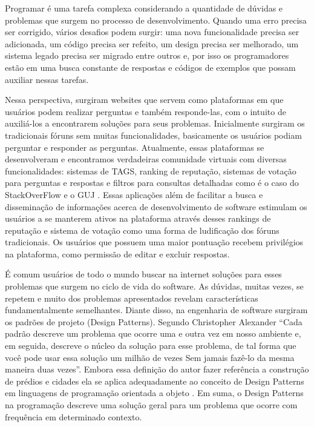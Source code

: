 Programar é uma tarefa complexa considerando a quantidade de dúvidas e problemas que surgem no processo de desenvolvimento. 
Quando uma erro precisa ser corrigido,  vários desafios podem surgir: uma nova funcionalidade precisa ser adicionada, um código precisa 
ser refeito, um design precisa ser melhorado, um sistema legado precisa ser migrado entre outros e, por isso os programadores estão em 
uma busca constante de respostas e códigos de exemplos que possam auxiliar nessas tarefas.

Nessa perspectiva, surgiram websites que servem como plataformas em que usuários podem realizar perguntas e também responde-las, 
com o intuito de auxiliá-los a encontrarem soluções para seus problemas. Inicialmente surgiram os tradicionais fóruns sem muitas  funcionalidades,
 basicamente os usuários podiam perguntar e responder as perguntas. Atualmente, essas plataformas se desenvolveram e encontramos verdadeiras
comunidade virtuais com diversas funcionalidades: sistemas de TAGS, ranking de reputação, sistemas de votação para perguntas e respostas e  
filtros para consultas detalhadas como é o caso do StackOverFlow \cite{stack} e o GUJ \cite{guj}. Essas aplicações além de facilitar a busca e disseminação 
de informações acerca de desenvolvimento de software estimulam os usuários a se manterem ativos na plataforma através desses rankings 
de reputação e sistema de votação como uma forma de ludificação dos fóruns tradicionais. Os usuários que possuem uma maior pontuação
recebem privilégios na plataforma, como permissão de editar e excluir respostas.

É comum usuários de todo o mundo buscar na internet soluções para esses problemas que surgem no ciclo de vida do software. As dúvidas,
muitas vezes, se repetem e muito dos problemas apresentados revelam  características fundamentalmente semelhantes. Diante disso, na engenharia
 de software surgiram os padrões de projeto (Design Patterns). Segundo Christopher Alexander “Cada padrão descreve um problema que ocorre uma 
e outra vez em nosso ambiente e, em seguida, descreve o núcleo da solução para esse problema, de tal forma que você pode usar essa solução um milhão
de vezes Sem jamais fazê-lo da mesma maneira duas vezes”\cite{gamma1995design}. Embora essa definição do autor fazer referência a construção 
de prédios e cidades ela se aplica adequadamente ao conceito de Design Patterns em linguagens de programação orientada a objeto \cite{alexander1977pattern}. 
Em suma, o Design Patterns na programação descreve uma solução geral para um problema que ocorre com frequência em determinado contexto.

